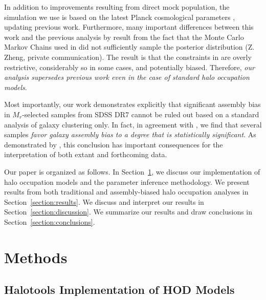 \documentclass[usenatbib,usegraphicx,letterpaper]{mn2e}
\newcommand{\magr}{M_r}
\begin{document}
In addition to improvements resulting from direct mock population,
the simulation we use is based on the latest Planck cosmological
parameters \citep{planck13}, updating previous work.
Furthermore, many important differences between this work 
and the previous analysis by \citet{zehavi_etal11} result from 
the fact that the Monte Carlo Markov Chains used in \citet{zehavi_etal11} did not 
sufficiently sample the posterior distribution (Z. Zheng, private communication). 
The result is that the constraints in \citet{zehavi_etal11} are overly restrictive, considerably so 
in some cases, and potentially biased. 
Therefore, {\em our analysis supersedes previous work even in the case of
standard halo occupation models}.


Most importantly, our work demonstrates explicitly that significant
assembly bias in $\magr$-selected samples from SDSS DR7 cannot be ruled
out based on a standard analysis of galaxy clustering only. In fact,
in agreement with \citet{lehmann_etal15}, we find that several samples
{\em favor galaxy assembly bias to a degree that is statistically
  significant}. As demonstrated by \citet{zentner_etal14}, this
conclusion has important consequences for the interpretation of
both extant and forthcoming data.


Our paper is organized as follows. In Section~\ref{section:methods},
we discuss our implementation of halo occupation models and the
parameter inference methodology. We present results
from both traditional and assembly-biased halo occupation analyses
in Section~\ref{section:results}. We discuss and interpret our results 
in Section~\ref{section:discussion}. We summarize our results and draw
conclusions in Section~\ref{section:conclusions}.


\section{Methods}
\label{section:methods}

\subsection{Halotools Implementation of HOD Models}
\label{subsection:halotools}
\end{document}
